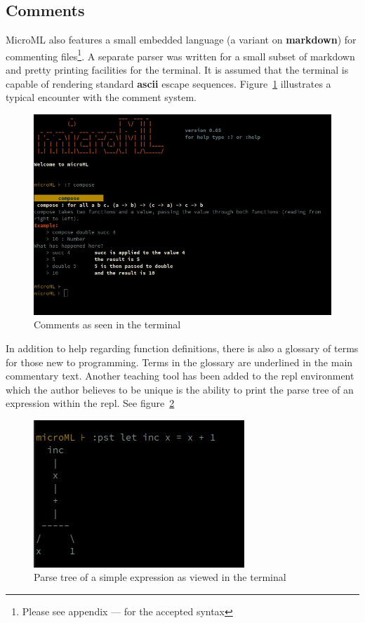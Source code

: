 \documentclass[12pt, a4paper]{report}
\begin{document}
\subsection{Comments}
MicroML also features a small embedded language (a variant on \textbf{markdown}) for commenting
files\footnote{Please see appendix --- for the accepted syntax}. A separate parser was written 
for a small subset of markdown and pretty printing facilities
for the terminal. It is assumed that the terminal is capable of rendering standard \textbf{ascii}
escape sequences. Figure~\ref{fig:comments} illustrates a typical encounter with the comment system.

\begin{figure}
    \includegraphics[scale=0.4]{images/comment.jpg}
    {\caption{Comments as seen in the terminal}}
    \label{fig:comments}
\end{figure}

In addition to help regarding function definitions, there is also a glossary of terms for those new
to programming. Terms in the glossary are underlined in the main commentary text.  Another teaching 
tool has been added to the repl environment which the author believes to be unique
is the ability to print the parse tree of an expression within the repl. See figure~\ref{fig:tree}

\begin{figure}
    \includegraphics[scale=0.6]{images/tree.jpg}
    {\caption{Parse tree of a simple expression as viewed in the terminal}}
    \label{fig:tree}
\end{figure}
\end{document}
